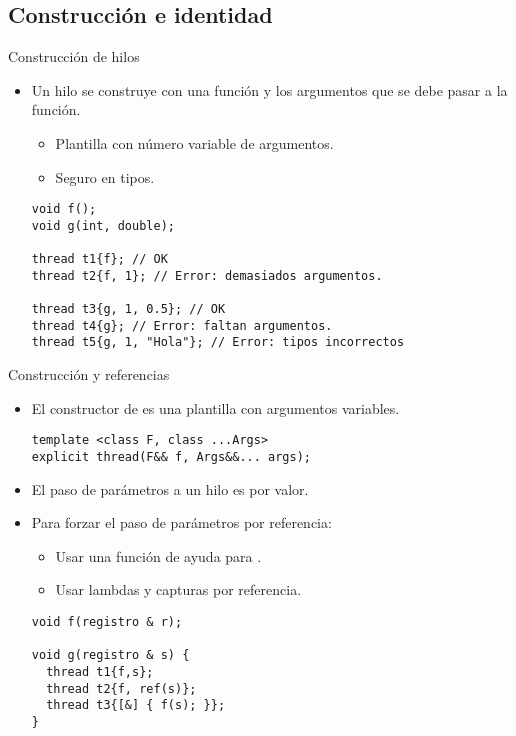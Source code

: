 \subsection{Construcción e identidad}

\begin{frame}[fragile]{Construcción de hilos}
\begin{itemize}
  \item Un hilo se construye con una función y los argumentos que se debe pasar a la función.
    \begin{itemize}
      \item Plantilla con número variable de argumentos.
      \item Seguro en tipos.
    \end{itemize}
\begin{lstlisting}
void f();
void g(int, double);

thread t1{f}; // OK
thread t2{f, 1}; // Error: demasiados argumentos.

thread t3{g, 1, 0.5}; // OK
thread t4{g}; // Error: faltan argumentos.
thread t5{g, 1, "Hola"}; // Error: tipos incorrectos
\end{lstlisting}
\end{itemize}
\end{frame}

\begin{frame}[fragile]{Construcción y referencias}
\begin{itemize}
  \item El constructor de  es una plantilla con argumentos variables.
\begin{lstlisting}
template <class F, class ...Args> 
explicit thread(F&& f, Args&&... args);
\end{lstlisting}
  \pause
  \item El paso de parámetros a un hilo es por valor.
  \item Para forzar el paso de parámetros por referencia:
    \begin{itemize}
      \item Usar una función de ayuda para .
      \item Usar lambdas y capturas por referencia.
    \end{itemize}
\begin{lstlisting}
void f(registro & r);

void g(registro & s) {
  thread t1{f,s};
  thread t2{f, ref(s)};
  thread t3{[&] { f(s); }};
}
\end{lstlisting}
\end{itemize}
\end{frame}

